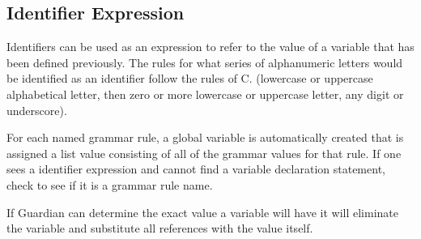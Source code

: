 
\subsection{Identifier Expression}
{
	Identifiers can be used as an expression to refer to the value
	of a variable that has been defined previously. The rules for what series
	of alphanumeric letters would be identified as an identifier follow the
	rules of C. (lowercase or uppercase alphabetical letter, then zero or more
	lowercase or uppercase letter, any digit or underscore).
	
	For each named grammar rule, a global variable is automatically created
	that is assigned a list value consisting of all of the grammar values
	for that rule. If one sees a identifier expression and cannot find
	a variable declaration statement, check to see if it is a grammar rule name.
	
	If Guardian can determine the exact value a variable will
	have it will eliminate
	the variable and substitute all references with the value itself.
}
